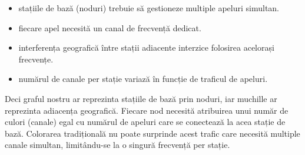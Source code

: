 \begin{itemize}
  \begin{itemize}
    \item stațiile de bază (noduri) trebuie să gestioneze multiple apeluri simultan.
    \item fiecare apel necesită un canal de frecvență dedicat.
    \item interferența geografică între stații adiacente interzice folosirea acelorași \\
    frecvențe. 
    \item numărul de canale per stație variază în funcție de traficul de apeluri.
  \end{itemize}
  Deci graful nostru ar reprezinta stațiile de bază prin noduri, iar muchille ar reprezinta adiacența geografică. Fiecare nod necesită atribuirea unui număr de culori (canale) egal cu numărul de apeluri care se conectează la acea stație de bază. Colorarea tradițională nu poate surprinde acest trafic care necesită multiple canale simultan, limitându-se la o singură frecvență per stație.
\end{itemize}
